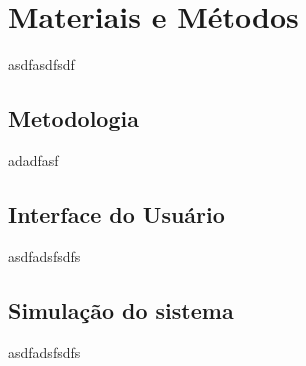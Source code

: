 \chapter{Materiais e Métodos}
\label{chap:mat}
asdfasdfsdf

\section{Metodologia}
\label{sec:met}
adadfasf

\section{Interface do Usuário}
\label{sec:ui}
asdfadsfsdfs

\section{Simulação do sistema}
\label{sec:sim}
asdfadsfsdfs


